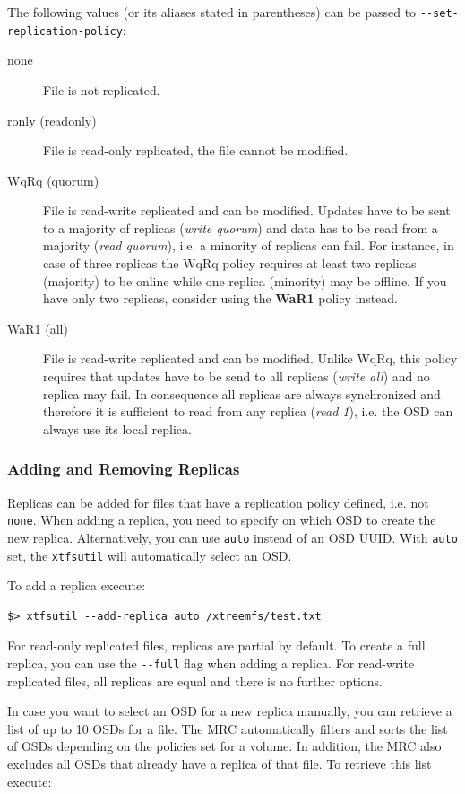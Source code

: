 \documentclass[a4paper,10pt]{book}
\begin{document}
The following values (or its aliases stated in parentheses) can be passed to \verb|--set-replication-policy|:
\begin{description}
  \item[none] File is not replicated.
  \item[ronly (readonly)] File is read-only replicated, the file cannot be modified.
  \item[WqRq (quorum)] File is read-write replicated and can be modified. Updates have to be sent to a majority of replicas (\textit{write quorum}) and data has to be read from a majority (\textit{read quorum}), i.e. a minority of replicas can fail. For instance, in case of three replicas the WqRq policy requires at least two replicas (majority) to be online while one replica (minority) may be offline. If you have only two replicas, consider using the \textbf{WaR1} policy instead.
  \item[WaR1 (all)] File is read-write replicated and can be modified. Unlike WqRq, this policy requires that updates have to be send to all replicas (\textit{write all}) and no replica may fail. In consequence all replicas are always synchronized and therefore it is sufficient to read from any replica (\textit{read 1}), i.e. the OSD can always use its local replica.
\end{description}


\subsubsection{Adding and Removing Replicas}

Replicas can be added for files that have a replication policy defined, i.e. not \texttt{none}. When adding a replica, you need to specify on which OSD to create the new replica. Alternatively, you can use \texttt{auto} instead of an OSD UUID. With \texttt{auto} set, the \texttt{xtfsutil} will automatically select an OSD.

To add a replica execute:

\begin{verbatim}
$> xtfsutil --add-replica auto /xtreemfs/test.txt
\end{verbatim}

For read-only replicated files, replicas are partial by default. To create a full replica, you can use the \verb|--full| flag when adding a replica. For read-write replicated files, all replicas are equal and there is no further options.

In case you want to select an OSD for a new replica manually, you can retrieve a list of up to 10 OSDs for a file. The MRC automatically filters and sorts the list of OSDs depending on the policies set for a volume. In addition, the MRC also excludes all OSDs that already have a replica of that file. To retrieve this list execute:
\end{document}
